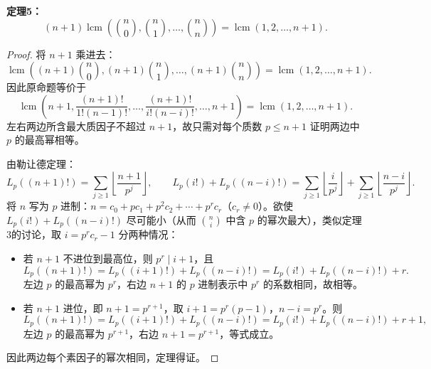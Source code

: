 \textbf{定理5：}
\[
(n+1)\operatorname{lcm}\left(\binom{n}{0}, \binom{n}{1}, \ldots, \binom{n}{n}\right) = \operatorname{lcm}(1,2,\ldots,n+1).
\]

\begin{proof}

将 $n+1$ 乘进去：
\[
\operatorname{lcm}\left((n+1)\binom{n}{0}, (n+1)\binom{n}{1}, \ldots, (n+1)\binom{n}{n}\right) = \operatorname{lcm}(1,2,\ldots,n+1).
\]
因此原命题等价于
\[
\operatorname{lcm}\left(n+1, \frac{(n+1)!}{1!(n-1)!}, \ldots, \frac{(n+1)!}{i!(n-i)!}, \ldots, n+1\right) = \operatorname{lcm}(1,2,\ldots,n+1).
\]
左右两边所含最大质因子不超过 $n+1$，故只需对每个质数 $p \le n+1$ 证明两边中 $p$ 的最高幂相等。

由勒让德定理：
\[
L_p((n+1)!) = \sum_{j\ge1}\left\lfloor\frac{n+1}{p^j}\right\rfloor,\qquad
L_p(i!)+L_p((n-i)!) = \sum_{j\ge1}\left\lfloor\frac{i}{p^j}\right\rfloor + \sum_{j\ge1}\left\lfloor\frac{n-i}{p^j}\right\rfloor.
\]
将 $n$ 写为 $p$ 进制：$n = c_0 + pc_1 + p^2c_2 + \cdots + p^r c_r$（$c_r \neq 0$）。欲使 $L_p(i!)+L_p((n-i)!)$ 尽可能小（从而 $\binom{n}{i}$ 中含 $p$ 的幂次最大），类似定理3的讨论，取 $i = p^r c_r - 1$ 分两种情况：
\begin{itemize}
\item 若 $n+1$ 不进位到最高位，则 $p^r \mid i+1$，且
\[
L_p((n+1)!) = L_p((i+1)!)+L_p((n-i)!)=L_p(i!)+L_p((n-i)!)+r.
\]
左边 $p$ 的最高幂为 $p^r$，右边 $n+1$ 的 $p$ 进制表示中 $p^r$ 的系数相同，故相等。
\item 若 $n+1$ 进位，即 $n+1 = p^{r+1}$，取 $i+1 = p^r(p-1)$，$n-i = p^r$。则
\[
L_p((n+1)!) = L_p((i+1)!)+L_p((n-i)!)=L_p(i!)+L_p((n-i)!)+r+1,
\]
左边 $p$ 的最高幂为 $p^{r+1}$，右边 $n+1 = p^{r+1}$，等式成立。
\end{itemize}
因此两边每个素因子的幂次相同，定理得证。

\end{proof}